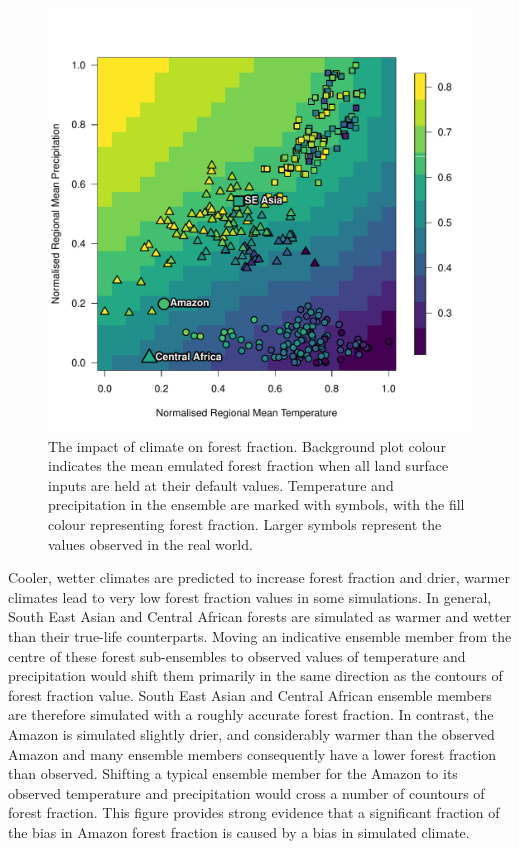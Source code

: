 \documentclass[gmd, manuscript]{copernicus}
\begin{document}
\begin{figure}[t]
\includegraphics[width=12cm]{../graphics/taat_temp_precip_quilt.pdf}
\caption{The impact of climate on forest fraction. Background plot colour indicates the mean emulated forest fraction when all land surface inputs are held at their default values. Temperature and precipitation in the ensemble are marked with symbols, with the fill colour representing forest fraction. Larger symbols represent the values observed in the real world.
}
\label{fig:taat_temp_precip_quilt}
\end{figure}

Cooler, wetter climates are predicted to increase forest fraction and drier, warmer climates lead to very low forest fraction values in some simulations. In general, South East Asian and Central African forests are simulated as warmer and wetter than their true-life counterparts. Moving an indicative ensemble member from the centre of these forest sub-ensembles to observed values of temperature and precipitation would shift them primarily in the same direction as the contours of forest fraction value. South East Asian and Central African ensemble members are  therefore simulated with a roughly accurate forest fraction. In contrast, the Amazon is simulated slightly drier, and considerably warmer than the observed Amazon and many ensemble members consequently have a lower forest fraction than observed. Shifting a typical ensemble member for the Amazon to its observed temperature and precipitation would cross a number of countours of forest fraction.  This figure provides strong evidence that a significant fraction of the bias in Amazon forest fraction is caused by a bias in simulated climate.
\end{document}
